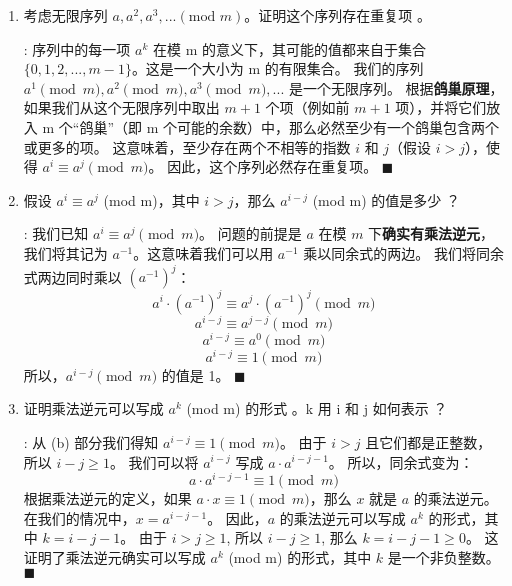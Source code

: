 \documentclass[11pt]{article}
\newenvironment{qparts}{\begin{enumerate}[{(}a{)}]}{\end{enumerate}}
\def\endproofmark{$\blacksquare$}
\newenvironment{proof}{\par\noindent{\bf 解答}:}{\endproofmark\smallskip}
\begin{document}
\begin{qparts}
\item 考虑无限序列 $a,a^{2},a^{3},...(\text{mod }m)$。证明这个序列存在重复项 。
\begin{proof}
序列中的每一项 $a^k$ 在模 m 的意义下，其可能的值都来自于集合 $\{0, 1, 2, ..., m-1\}$。这是一个大小为 m 的有限集合。
我们的序列 $a^1 \pmod m, a^2 \pmod m, a^3 \pmod m, ...$ 是一个无限序列。
根据\textbf{鸽巢原理}，如果我们从这个无限序列中取出 $m+1$ 个项（例如前 $m+1$ 项），并将它们放入 m 个“鸽巢”（即 m 个可能的余数）中，那么必然至少有一个鸽巢包含两个或更多的项。
这意味着，至少存在两个不相等的指数 $i$ 和 $j$（假设 $i>j$），使得 $a^i \equiv a^j \pmod m$。
因此，这个序列必然存在重复项。
\end{proof}

\item 假设 $a^{i}\equiv a^{j}$ (mod m)，其中 $i>j$，那么 $a^{i-j}$ (mod m) 的值是多少 ？
\begin{proof}
我们已知 $a^{i} \equiv a^{j} \pmod m$。
问题的前提是 $a$ 在模 $m$ 下\textbf{确实有乘法逆元}，我们将其记为 $a^{-1}$。这意味着我们可以用 $a^{-1}$ 乘以同余式的两边。
我们将同余式两边同时乘以 $(a^{-1})^j$：
\[ a^i \cdot (a^{-1})^j \equiv a^j \cdot (a^{-1})^j \pmod m \]
\[ a^{i-j} \equiv a^{j-j} \pmod m \]
\[ a^{i-j} \equiv a^0 \pmod m \]
\[ a^{i-j} \equiv 1 \pmod m \]
所以，$a^{i-j} \pmod m$ 的值是 1。
\end{proof}

\item 证明乘法逆元可以写成 $a^{k}$ (mod m) 的形式 。k 用 i 和 j 如何表示 ？
\begin{proof}
从 (b) 部分我们得知 $a^{i-j} \equiv 1 \pmod m$。
由于 $i>j$ 且它们都是正整数，所以 $i-j \ge 1$。
我们可以将 $a^{i-j}$ 写成 $a \cdot a^{i-j-1}$。
所以，同余式变为：
\[ a \cdot a^{i-j-1} \equiv 1 \pmod m \]
根据乘法逆元的定义，如果 $a \cdot x \equiv 1 \pmod m$，那么 $x$ 就是 $a$ 的乘法逆元。
在我们的情况中，$x = a^{i-j-1}$。
因此，$a$ 的乘法逆元可以写成 $a^k$ 的形式，其中 $k = i-j-1$。
由于 $i>j \ge 1$, 所以 $i-j \ge 1$, 那么 $k = i-j-1 \ge 0$。
这证明了乘法逆元确实可以写成 $a^k$ (mod m) 的形式，其中 $k$ 是一个非负整数。
\end{proof}

\end{qparts}
\end{document}

